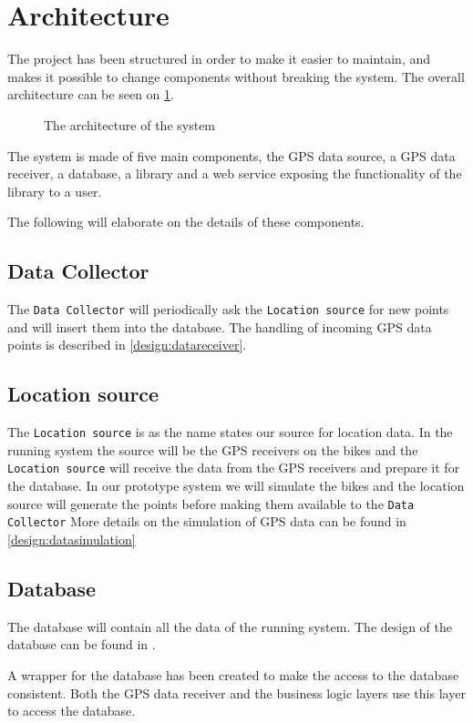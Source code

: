 \section{Architecture}

The project has been structured in order to make it easier to maintain, and makes it possible to change components without breaking the system.
The overall architecture can be seen on \cref{arch}.

\begin{figure}[h]
\center

\caption{The architecture of the system}
\label{arch}
\end{figure}

The system is made of five main components, the GPS data source, a GPS data receiver, a database, a library and a web service exposing the functionality of the library to a user.

The following will elaborate on the details of these components.

\subsection{Data Collector}
The \texttt{Data Collector} will periodically ask the \texttt{Location source} for new points and will insert them into the database. 
The handling of incoming GPS data points is described in \cref{design:datareceiver}.

\subsection{Location source}
The \texttt{Location source} is as the name states our source for location data.
In the running system the source will be the GPS receivers on the bikes and the \texttt{Location source} will receive the data from the GPS receivers and prepare it for the database.
In our prototype system we will simulate the bikes and the location source will generate the points before making them available to the \texttt{Data Collector}
More details on the simulation of GPS data can be found in \cref{design:datasimulation}

\subsection{Database}
The database will contain all the data of the running system.
The design of the database can be found in .

A wrapper for the database has been created to make the access to the database consistent. 
Both the GPS data receiver and the business logic layers use this layer to access the database.

